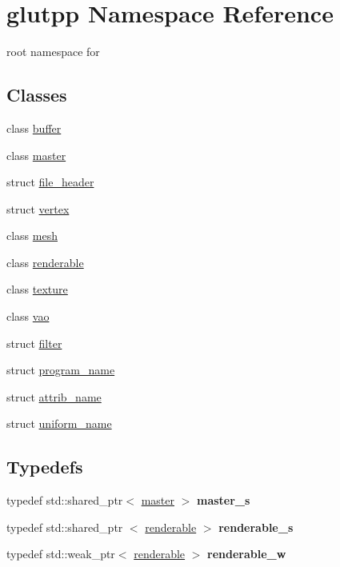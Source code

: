 \hypertarget{namespaceglutpp}{\section{glutpp \-Namespace \-Reference}
\label{namespaceglutpp}
}


root namespace for   


\subsection*{\-Classes}
\begin{DoxyCompactItemize}
\item 
class \hyperlink{classglutpp_1_1buffer}{buffer}
\item 
class \hyperlink{classglutpp_1_1master}{master}
\item 
struct \hyperlink{structglutpp_1_1file__header}{file\-\_\-header}
\item 
struct \hyperlink{structglutpp_1_1vertex}{vertex}
\item 
class \hyperlink{classglutpp_1_1mesh}{mesh}
\item 
class \hyperlink{classglutpp_1_1renderable}{renderable}
\item 
class \hyperlink{classglutpp_1_1texture}{texture}
\item 
class \hyperlink{classglutpp_1_1vao}{vao}
\item 
struct \hyperlink{structglutpp_1_1filter}{filter}
\item 
struct \hyperlink{structglutpp_1_1program__name}{program\-\_\-name}
\item 
struct \hyperlink{structglutpp_1_1attrib__name}{attrib\-\_\-name}
\item 
struct \hyperlink{structglutpp_1_1uniform__name}{uniform\-\_\-name}
\end{DoxyCompactItemize}
\subsection*{\-Typedefs}
\begin{DoxyCompactItemize}
\item 
\hypertarget{namespaceglutpp_ad416fff92cdabdc3141618680ccd1945}{typedef std\-::shared\-\_\-ptr$<$ \hyperlink{classglutpp_1_1master}{master} $>$ {\bfseries master\-\_\-s}}\label{namespaceglutpp_ad416fff92cdabdc3141618680ccd1945}

\item 
\hypertarget{namespaceglutpp_a67ccde707354c95f87efe65589d3219d}{typedef std\-::shared\-\_\-ptr\*
$<$ \hyperlink{classglutpp_1_1renderable}{renderable} $>$ {\bfseries renderable\-\_\-s}}\label{namespaceglutpp_a67ccde707354c95f87efe65589d3219d}

\item 
\hypertarget{namespaceglutpp_ab992d93431ecb78e57041c940827dd90}{typedef std\-::weak\-\_\-ptr$<$ \hyperlink{classglutpp_1_1renderable}{renderable} $>$ {\bfseries renderable\-\_\-w}}\label{namespaceglutpp_ab992d93431ecb78e57041c940827dd90}

\end{DoxyCompactItemize}
